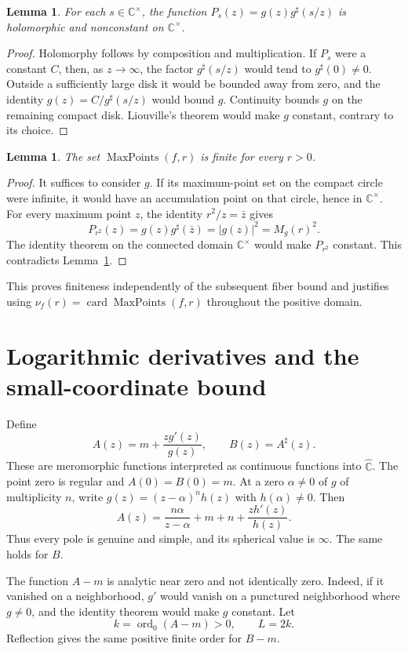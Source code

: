 \documentclass[11pt]{article}
\newtheorem{lemma}[theorem]{Lemma}
\numberwithin{equation}{section}
\newcommand{\C}{\mathbb C}
\newcommand{\Cs}{\C^{\times}}
\newcommand{\Chat}{\widehat{\C}}
\newcommand{\Max}{\operatorname{MaxPoints}}
\newcommand{\card}{\operatorname{card}}
\newcommand{\ord}{\operatorname{ord}}
\begin{document}
\begin{lemma}\label{lem:product}
For each $s\in\Cs$, the function
$P_s(z)=g(z)g^\sharp(s/z)$ is holomorphic and nonconstant on $\Cs$.
\end{lemma}

\begin{proof}
Holomorphy follows by composition and multiplication. If $P_s$ were a
constant $C$, then, as $z\to\infty$, the factor $g^\sharp(s/z)$ would tend
to $g^\sharp(0)\ne0$. Outside a sufficiently large disk it would be
bounded away from zero, and the identity
$g(z)=C/g^\sharp(s/z)$ would bound $g$. Continuity bounds $g$ on the
remaining compact disk. Liouville's theorem would make $g$ constant,
contrary to its choice.
\end{proof}

\begin{lemma}\label{lem:circle-finite}
The set $\Max(f,r)$ is finite for every $r>0$.
\end{lemma}

\begin{proof}
It suffices to consider $g$. If its maximum-point set on the compact
circle were infinite, it would have an accumulation point on that circle,
hence in $\Cs$. For every maximum point $z$, the identity
$r^2/z=\bar z$ gives
\[
 P_{r^2}(z)=g(z)g^\sharp(\bar z)=|g(z)|^2=M_g(r)^2.
\]
The identity theorem on the connected domain $\Cs$ would make
$P_{r^2}$ constant. This contradicts Lemma~\ref{lem:product}.
\end{proof}

This proves finiteness independently of the subsequent fiber bound and
justifies using $\nu_f(r)=\card\Max(f,r)$ throughout the positive domain.

\section{Logarithmic derivatives and the small-coordinate bound}
\label{sec:small}

Define
\[
 A(z)=m+\frac{zg'(z)}{g(z)},\qquad B(z)=A^\sharp(z).
\]
These are meromorphic functions interpreted as continuous functions into
$\Chat$. The point zero is regular and $A(0)=B(0)=m$. At a zero
$\alpha\ne0$ of $g$ of multiplicity $n$, write
$g(z)=(z-\alpha)^n h(z)$ with $h(\alpha)\ne0$. Then
\[
 A(z)=\frac{n\alpha}{z-\alpha}+m+n+\frac{zh'(z)}{h(z)}.
\]
Thus every pole is genuine and simple, and its spherical value is
$\infty$. The same holds for $B$.

The function $A-m$ is analytic near zero and not identically zero. Indeed,
if it vanished on a neighborhood, $g'$ would vanish on a punctured
neighborhood where $g\ne0$, and the identity theorem would make $g$
constant. Let
\[
 k=\ord_0(A-m)>0,\qquad L=2k.
\]
Reflection gives the same positive finite order for $B-m$.
\end{document}
